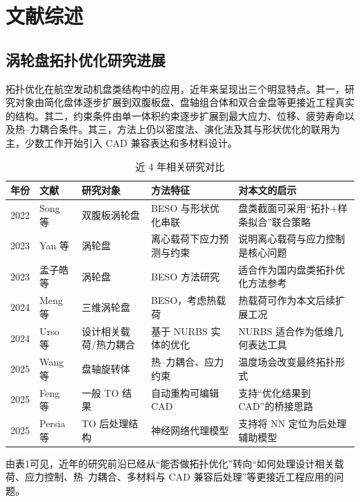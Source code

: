 \documentclass{FRB-style}
\begin{document}
\section{文献综述}

\subsection{涡轮盘拓扑优化研究进展}

拓扑优化在航空发动机盘类结构中的应用，近年来呈现出三个明显特点。其一，研究对象由简化盘体逐步扩展到双腹板盘、盘轴组合体和双合金盘等更接近工程真实的结构。其二，约束条件由单一体积约束逐步扩展到最大应力、位移、疲劳寿命以及热--力耦合条件。其三，方法上仍以密度法、演化法及其与形状优化的联用为主，少数工作开始引入 CAD 兼容表达和多材料设计\cite{Song2022,Yan2023,Meng2024,Wang2025,Yan2025MM,Meng2023CN}。

\begin{table}[H]
\centering
\caption{近 4 年相关研究对比}
\begin{tabular}{p{}p{}p{}p{}p{}}
\toprule
年份 & 文献 & 研究对象 & 方法特征 & 对本文的启示 \\
\midrule
2022 & Song 等\cite{Song2022} & 双腹板涡轮盘 & BESO 与形状优化串联 & 盘类截面可采用“拓扑+样条拟合”联合策略 \\
2023 & Yan 等\cite{Yan2023} & 涡轮盘 & 离心载荷下应力预测与约束 & 说明离心载荷与应力控制是核心问题 \\
2023 & 孟子皓等\cite{Meng2023CN} & 涡轮盘 & BESO 方法研究 & 适合作为国内盘类拓扑优化方法参考 \\
2024 & Meng 等\cite{Meng2024} & 三维涡轮盘 & BESO，考虑热载荷 & 热载荷可作为本文后续扩展工况 \\
2024 & Urso 等\cite{Urso2024DDL,Urso2024TM} & 设计相关载荷/热力耦合 & 基于 NURBS 实体的优化 & NURBS 适合作为低维几何表达工具 \\
2025 & Wang 等\cite{Wang2025} & 盘轴旋转体 & 热--力耦合、应力约束 & 温度场会改变最终拓扑形式 \\
2025 & Feng 等\cite{Feng2025} & 一般 TO 结果 & 自动重构可编辑 CAD & 支持“优化结果到 CAD”的桥接思路 \\
2025 & Persia 等\cite{Persia2025} & TO 后处理结构 & 神经网络代理模型 & 支持将 NN 定位为后处理辅助模型 \\
\bottomrule
\end{tabular}
\end{table}

由表1可见，近年的研究前沿已经从“能否做拓扑优化”转向“如何处理设计相关载荷、应力控制、热--力耦合、多材料与 CAD 兼容后处理”等更接近工程应用的问题\cite{Song2022,Yan2023,Wang2025,Yan2025MM}。
\end{document}
